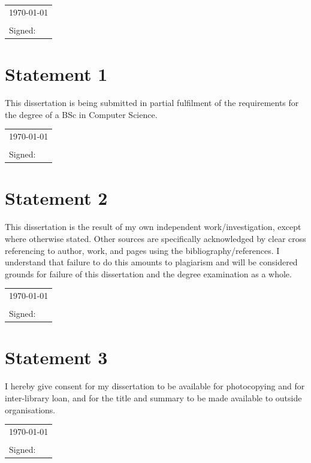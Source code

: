 \documentclass[11pt,a4paper, notitlepage]{report}
\begin{document}
\vspace{0.5cm}
\begin{tabular}{l}
\today\\
\\
Signed:
\end{tabular}

\section*{Statement 1}
This dissertation is being submitted in partial fulfilment of the
requirements for the degree of a BSc in Computer Science.

\vspace{0.5cm}
\begin{tabular}{l}
\today\\
\\
Signed:
\end{tabular}

\section*{Statement 2}

This dissertation is the result of my own independent
work/investigation, except where otherwise stated. Other sources are
specifically acknowledged by clear cross referencing to author, work,
and pages using the bibliography/references. I understand that failure
to do this amounts to plagiarism and will be considered grounds for
failure of this dissertation and the degree examination as a whole.

\vspace{0.5cm}
\begin{tabular}{l}
\today\\
\\
Signed:
\end{tabular}

\section*{Statement 3}

I hereby give consent for my dissertation to be available for
photocopying and for inter-library loan, and for the title and summary
to be made available to outside organisations.

\vspace{0.5cm}
\begin{tabular}{l}
\today\\
\\
Signed:
\end{tabular}
\end{document}
